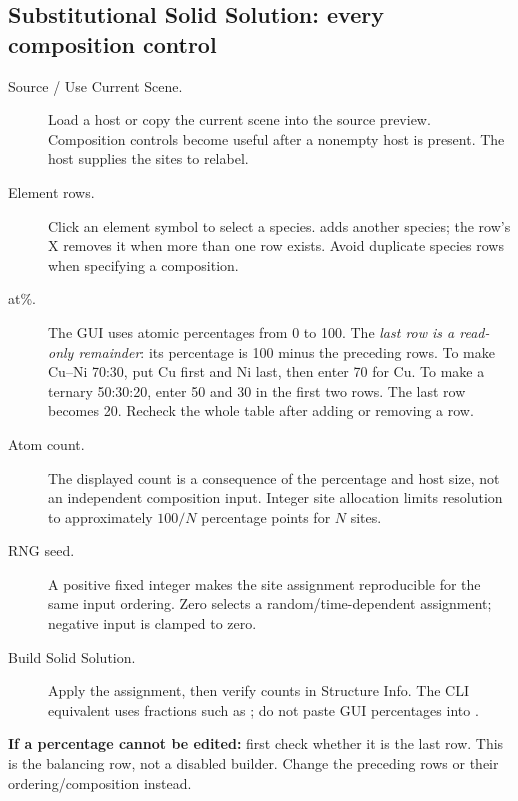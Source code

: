 \subsection{Substitutional Solid Solution: every composition control}
\begin{description}
\item[Source / Use Current Scene.] Load a host or copy the current scene into the source preview. Composition controls become useful after a nonempty host is present. The host supplies the sites to relabel.
\item[Element rows.] Click an element symbol to select a species.  adds another species; the row's X removes it when more than one row exists. Avoid duplicate species rows when specifying a composition.
\item[at\%.] The GUI uses atomic percentages from 0 to 100. The \emph{last row is a read-only remainder}: its percentage is 100 minus the preceding rows. To make Cu--Ni 70:30, put Cu first and Ni last, then enter 70 for Cu. To make a ternary 50:30:20, enter 50 and 30 in the first two rows. The last row becomes 20. Recheck the whole table after adding or removing a row.
\item[Atom count.] The displayed count is a consequence of the percentage and host size, not an independent composition input. Integer site allocation limits resolution to approximately $100/N$ percentage points for $N$ sites.
\item[RNG seed.] A positive fixed integer makes the site assignment reproducible for the same input ordering. Zero selects a random/time-dependent assignment; negative input is clamped to zero.
\item[Build Solid Solution.] Apply the assignment, then verify counts in Structure Info. The CLI equivalent uses fractions such as ; do not paste GUI percentages into .
\end{description}
\textbf{If a percentage cannot be edited:} first check whether it is the last row. This is the balancing row, not a disabled builder. Change the preceding rows or their ordering/composition instead.

